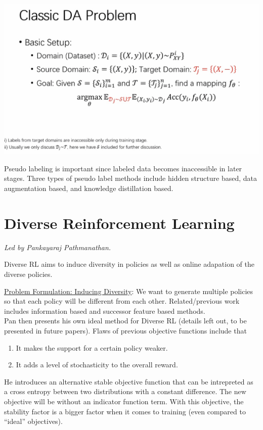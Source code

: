 \documentclass[12pt]{amsart}
\begin{document}
\includegraphics[scale = 0.25]{ClassicDA_Setup.jpg}

Pseudo labeling is important since labeled data becomes inaccessible in later stages. Three types of pseudo label methods include hidden structure based, data augmentation based, and knowledge distillation based. \\

\section{Diverse Reinforcement Learning}

\textit{Led by Pankayaraj Pathmanathan.} \\

\begin{definition}[Diverse RL]
    Diverse RL aims to induce diversity in policies as well as online adapation of the diverse policies. 
\end{definition}

\underline{Problem Formulation: Inducing Diversity}: We want to generate multiple policies so that each policy will be different from each other. Related/previous work includes information based and successor feature based methods.\\

Pan then presents his own ideal method for Diverse RL (details left out, to be presented in future papers). Flaws of previous objective functions include that
\begin{enumerate}
    \item It makes the support for a certain policy weaker.
    \item It adds a level of stochasticity to the overall reward.
\end{enumerate}

He introduces an alternative stable objective function that can be intrepreted as a cross entropy between two distributions with a constant difference. The new objective will be without an indicator function term. With this objective, the stability factor is a bigger factor when it comes to training (even compared to ``ideal'' objectives).
\end{document}
